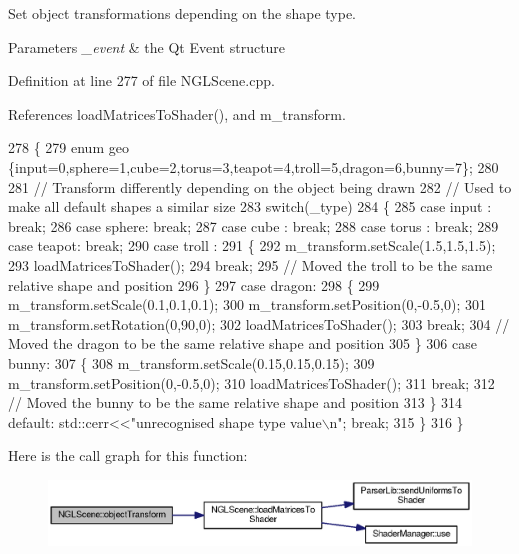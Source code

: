 Set object transformations depending on the shape type. 


\begin{DoxyParams}{Parameters}
{\em \-\_\-event} & the Qt Event structure \\
\hline
\end{DoxyParams}


Definition at line 277 of file N\-G\-L\-Scene.\-cpp.



References load\-Matrices\-To\-Shader(), and m\-\_\-transform.


\begin{DoxyCode}
278 \{
279   \textcolor{keyword}{enum} geo \{input=0,sphere=1,cube=2,torus=3,teapot=4,troll=5,dragon=6,bunny=7\};
280 
281   \textcolor{comment}{// Transform differently depending on the object being drawn}
282   \textcolor{comment}{// Used to make all default shapes a similar size}
283   \textcolor{keywordflow}{switch}(\_type)
284   \{
285   \textcolor{keywordflow}{case} input : \textcolor{keywordflow}{break};
286   \textcolor{keywordflow}{case} sphere: \textcolor{keywordflow}{break};
287   \textcolor{keywordflow}{case} cube  : \textcolor{keywordflow}{break};
288   \textcolor{keywordflow}{case} torus : \textcolor{keywordflow}{break};
289   \textcolor{keywordflow}{case} teapot: \textcolor{keywordflow}{break};
290   \textcolor{keywordflow}{case} troll :
291   \{
292     m_transform.setScale(1.5,1.5,1.5);
293     loadMatricesToShader();
294     \textcolor{keywordflow}{break};
295     \textcolor{comment}{// Moved the troll to be the same relative shape and position}
296   \}
297   \textcolor{keywordflow}{case} dragon:
298   \{
299     m_transform.setScale(0.1,0.1,0.1);
300     m_transform.setPosition(0,-0.5,0);
301     m_transform.setRotation(0,90,0);
302     loadMatricesToShader();
303     \textcolor{keywordflow}{break};
304     \textcolor{comment}{// Moved the dragon to be the same relative shape and position}
305   \}
306   \textcolor{keywordflow}{case} bunny:
307   \{
308     m_transform.setScale(0.15,0.15,0.15);
309     m_transform.setPosition(0,-0.5,0);
310     loadMatricesToShader();
311     \textcolor{keywordflow}{break};
312     \textcolor{comment}{// Moved the bunny to be the same relative shape and position}
313   \}
314   \textcolor{keywordflow}{default}: std::cerr<<\textcolor{stringliteral}{"unrecognised shape type value\(\backslash\)n"}; \textcolor{keywordflow}{break};
315   \}
316 \}
\end{DoxyCode}


Here is the call graph for this function\-:\nopagebreak
\begin{figure}[H]
\begin{center}
\leavevmode
\includegraphics[width=350pt]{class_n_g_l_scene_ae3e8dc1c180d89afa997104c3dd707a0_cgraph}
\end{center}
\end{figure}




